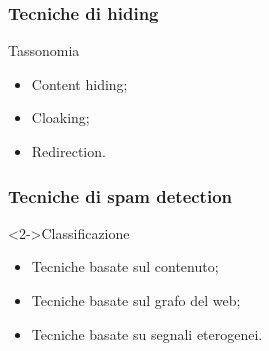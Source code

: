 \documentclass{beamer}
\begin{document}
\begin{frame}
    \frametitle{Tecniche di hiding}
    \begin{block}{Tassonomia}
    \begin{itemize}
    \item Content hiding;
    \item Cloaking;
    \item Redirection.
    \end{itemize}
    \end{block}
\end{frame}
\begin{frame}
    \frametitle{Tecniche di spam detection}
    \begin{block}<2->{Classificazione}
    \begin{itemize}
    \item<3->Tecniche basate sul contenuto;	
    \item<4->Tecniche basate sul grafo del web;
    \item<5->Tecniche basate su segnali eterogenei.
    \end{itemize}
    \end{block}
\end{frame}
\end{document}
